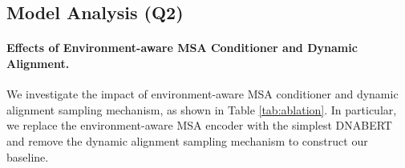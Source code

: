 \begin{table*}[t]
\caption{Summary of CLIBDScore and success rate evalutions at different thresholds on the unseen set. }
\label{table:Q2_unseen_compare}
\centering
{}
\vspace{-1em}
\end{table*}

\subsection{Model Analysis (Q2)}
\paragraph{Effects of Environment-aware MSA Conditioner and Dynamic Alignment.}
We investigate the impact of environment-aware MSA conditioner and dynamic alignment sampling mechanism, as shown in Table \ref{tab:ablation}. In particular, we replace the environment-aware MSA encoder with the simplest DNABERT\cite{ji2021dnabert} and remove the dynamic alignment sampling mechanism to construct our baseline.

